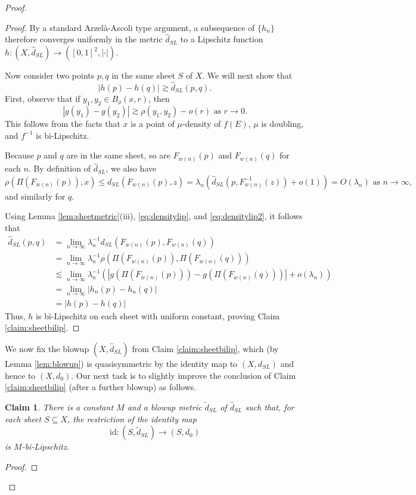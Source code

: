 \documentclass{amsart}
\theoremstyle{plain}
\newtheorem{claim}[theorem]{Claim}
\theoremstyle{definition}
\numberwithin{equation}{section}
\numberwithin{theorem}{section}
\begin{document}
\begin{proof}
\begin{proof}
By a standard Arzel\`a-Ascoli type argument, a subsequence of $\{h_n\}$ therefore converges uniformly in the metric $\hat{d}_{SL}$ to a Lipschitz function $h\colon (X,\hat{d}_{SL}) \rightarrow ([0,1]^2,|\cdot|)$. 

Now consider two points $p,q$ in the same sheet $S$ of $X$. We will next show that 
$$ |h(p)-h(q)| \gtrsim \hat{d}_{SL}(p,q).$$
First, observe that if $y_1, y_2 \in B_\rho(x,r)$, then 
\begin{equation}\label{eq:densitylip}
 |g(y_1) - g(y_2)| \gtrsim \rho(y_1,y_2) - o(r) \text{ as } r\rightarrow 0.
 \end{equation}
This follows from the facts that $x$ is a point of $\mu$-density of $f(E)$, $\mu$ is doubling, and $f^{-1}$ is bi-Lipschitz.

Because $p$ and $q$ are in the same sheet, so are $F_{w(n)}(p)$ and $F_{w(n)}(q)$ for each $n$. By definition of $\hat{d}_{SL}$, we also have
\begin{equation}\label{eq:densitylip2}
\rho(\Pi(F_{w(n)}(p)), x) \leq d_{SL}(F_{w(n)}(p), z) = \lambda_n(\hat{d}_{SL}(p, F_{w(n)}^{-1}(z)) + o(1)) =  O(\lambda_n) \text{ as } n\rightarrow \infty,
\end{equation}
and similarly for $q$. 

Using Lemma \ref{lem:sheetmetric}(iii), \eqref{eq:densitylip}, and \eqref{eq:densitylip2}, it follows that
\begin{align*}
\hat{d}_{SL}(p,q) &= \lim_{n\rightarrow\infty} \lambda_n^{-1} d_{SL}(F_{w(n)}(p), F_{w(n)}(q))\\
&= \lim_{n\rightarrow\infty} \lambda_n^{-1} \rho(\Pi(F_{w(n)}(p)), \Pi(F_{w(n)}(q)))\\
&\lesssim \lim_{n\rightarrow\infty} \lambda_n^{-1}( | g(\Pi(F_{w(n)}(p))) - g(\Pi(F_{w(n)}(q)))| + o(\lambda_n))\\
&= \lim_{n\rightarrow\infty} |h_n(p) - h_n(q)|\\
&= |h(p) - h(q)|
\end{align*}
Thus, $h$ is bi-Lipschitz on each sheet with uniform constant, proving Claim \ref{claim:sheetbilip}.
\end{proof}

We now fix the blowup $(X,\hat{d}_{SL})$ from Claim \ref{claim:sheetbilip}, which (by Lemma \ref{lem:blowup}) is quasisymmetric by the identity map to $(X,d_{SL})$ and hence to $(X,d_0)$. Our next task is to slightly improve the conclusion of Claim \ref{claim:sheetbilip} (after a further blowup) as follows.

\begin{claim}\label{claim:sheetbilip2}
There is a constant $M$ and a blowup metric $\tilde{d}_{SL}$ of $\hat{d}_{SL}$ such that, for each sheet $S\subseteq X$, the restriction of the identity map
$$ \text{id}:(S, \tilde{d}_{SL}) \rightarrow (S, d_0)$$
is $M$-bi-Lipschitz.
\end{claim}
\begin{proof}


\end{proof}
\end{proof}
\end{document}
